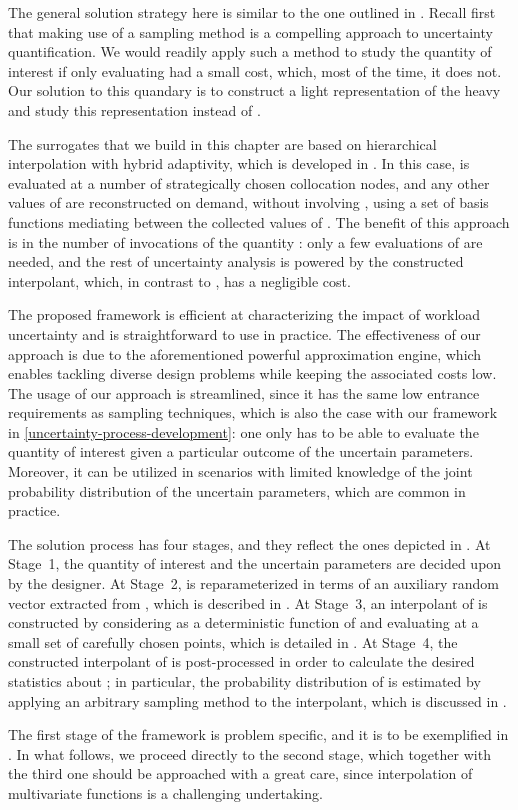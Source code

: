 The general solution strategy here is similar to the one outlined in
. Recall first that making use of a sampling method is a
compelling approach to uncertainty quantification. We would readily apply such a
method to study the quantity of interest \g if only evaluating \g had a small
cost, which, most of the time, it does not. Our solution to this quandary is to
construct a light representation of the heavy \g and study this representation
instead of \g.

The surrogates that we build in this chapter are based on hierarchical
interpolation with hybrid adaptivity, which is developed in \cite{klimke2006,
ma2009, jakeman2012}. In this case, \g is evaluated at a number of strategically
chosen collocation nodes, and any other values of \g are reconstructed on
demand, without involving \g, using a set of basis functions mediating between
the collected values of \g. The benefit of this approach is in the number of
invocations of the quantity \g: only a few evaluations of \g are needed, and the
rest of uncertainty analysis is powered by the constructed interpolant, which,
in contrast to \g, has a negligible cost.

The proposed framework is efficient at characterizing the impact of workload
uncertainty and is straightforward to use in practice. The effectiveness of our
approach is due to the aforementioned powerful approximation engine, which
enables tackling diverse design problems while keeping the associated costs low.
The usage of our approach is streamlined, since it has the same low entrance
requirements as sampling techniques, which is also the case with our framework
in \cref{uncertainty-process-development}: one only has to be able to evaluate
the quantity of interest given a particular outcome of the uncertain parameters.
Moreover, it can be utilized in scenarios with limited knowledge of the joint
probability distribution of the uncertain parameters, which are common in
practice.

The solution process has four stages, and they reflect the ones depicted in
. At Stage~1, the quantity of interest \g and the uncertain
parameters \vu are decided upon by the designer. At Stage~2, \g is
reparameterized in terms of an auxiliary random vector \vz extracted from \vu,
which is described in . At Stage~3, an interpolant of
\g is constructed by considering \g as a deterministic function of \vz and
evaluating \g at a small set of carefully chosen points, which is detailed in
. At Stage~4, the constructed interpolant of \g is
post-processed in order to calculate the desired statistics about \g; in
particular, the probability distribution of \g is estimated by applying an
arbitrary sampling method to the interpolant, which is discussed in
.

The first stage of the framework is problem specific, and it is to be
exemplified in . In what follows, we proceed directly to
the second stage, which together with the third one should be approached with a
great care, since interpolation of multivariate functions is a challenging
undertaking.
